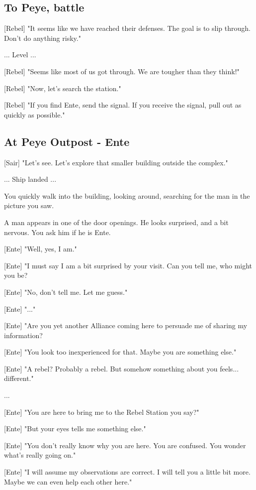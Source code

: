 \documentclass[a4paper,12pt]{article}
\begin{document}
\subsection{To Peye, battle}

[Rebel] "It seems like we have reached their defenses. The goal is to slip through. Don't do anything risky."

... Level ...

[Rebel] "Seems like most of us got through. We are tougher than they think!" 

[Rebel] "Now, let's search the station."

[Rebel] "If you find Ente, send the signal. If you receive the signal, pull out as quickly as possible."

\subsection{At Peye Outpost - Ente}

[Sair] "Let's see. Let's explore that smaller building outside the complex."

... Ship landed ...

You quickly walk into the building, looking around, searching for the man in the picture you saw.

A man appears in one of the door openings. He looks surprised, and a bit nervous. You ask him if he is Ente.

[Ente] "Well, yes, I am." 

[Ente] "I must say I am a bit surprised by your visit. Can you tell me, who might you be? 

[Ente] "No, don't tell me. Let me guess."

[Ente] "..."

[Ente] "Are you yet another Alliance coming here to persuade me of sharing my information? 

[Ente] "You look too inexperienced for that. Maybe you are something else." 

[Ente] "A rebel? Probably a rebel. But somehow something about you feels... different."

...

[Ente] "You are here to bring me to the Rebel Station you say?"

[Ente] "But your eyes tells me something else." 

[Ente] "You don't really know why you are here. You are confused. You wonder what's really going on."

[Ente] "I will assume my observations are correct. I will tell you a little bit more. 
Maybe we can even help each other here."
\end{document}
